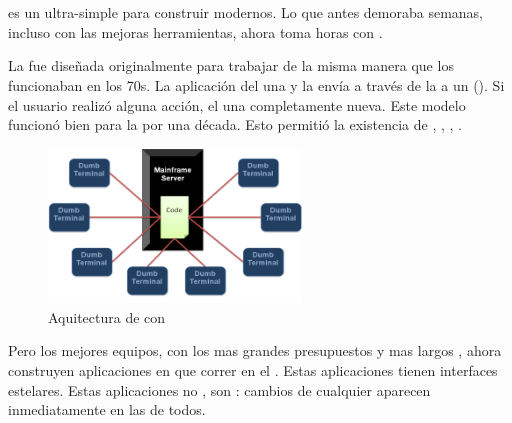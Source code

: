 
\chapter{\meteor}\label{cap:chapter_meteor}


\meteor es un \environment ultra-simple para construir \websites modernos. Lo que antes demoraba semanas, incluso con las mejoras herramientas, ahora toma horas con \meteor.

La \web fue diseñada originalmente para trabajar de la misma manera que los \mainframes funcionaban en los 70s. La aplicación del \serverAS \rendered una \screen y la envía a través de la \network a un \dumbterminal (). Si el usuario realizó alguna acción, el \serverAS \rendered una \screen completamente nueva. Este modelo funcionó bien para la \web por una década. Esto permitió la existencia de \lamp, \rails, \django, \phpNAME.

\begin{figure}[h!]
	\centering
	\includegraphics[width=0.6\textwidth]{figuras/mainframeServer_dumbterminal.png}
	\caption{Aquitectura de \mainframe con \dumbterminal}
	\label{figure:mainframeServer_dumbterminal}
\end{figure}


Pero los mejores equipos, con los mas grandes presupuestos y mas largos \schedules, ahora construyen aplicaciones en \javaScriptNAME que correr en el \clientAS. Estas aplicaciones tienen interfaces estelares. Estas aplicaciones no \reload \pages, son \reactive: cambios de cualquier \clientAS aparecen inmediatamente en las \screen de todos.

